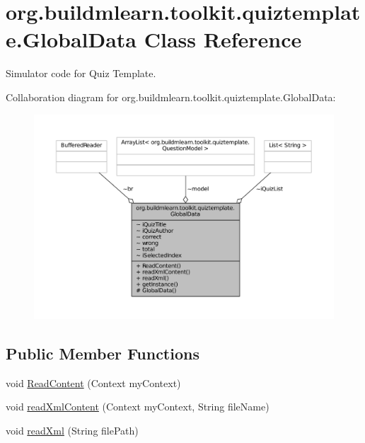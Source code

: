 \hypertarget{classorg_1_1buildmlearn_1_1toolkit_1_1quiztemplate_1_1GlobalData}{\section{org.\-buildmlearn.\-toolkit.\-quiztemplate.\-Global\-Data Class Reference}
\label{classorg_1_1buildmlearn_1_1toolkit_1_1quiztemplate_1_1GlobalData}
}


Simulator code for Quiz Template.  




Collaboration diagram for org.\-buildmlearn.\-toolkit.\-quiztemplate.\-Global\-Data\-:
\nopagebreak
\begin{figure}[H]
\begin{center}
\leavevmode
\includegraphics[width=350pt]{db/db2/classorg_1_1buildmlearn_1_1toolkit_1_1quiztemplate_1_1GlobalData__coll__graph}
\end{center}
\end{figure}
\subsection*{Public Member Functions}
\begin{DoxyCompactItemize}
\item 
void \hyperlink{classorg_1_1buildmlearn_1_1toolkit_1_1quiztemplate_1_1GlobalData_aedd79ff6db8cfbf154c09f911f3b1c46}{Read\-Content} (Context my\-Context)
\item 
void \hyperlink{classorg_1_1buildmlearn_1_1toolkit_1_1quiztemplate_1_1GlobalData_abed3c168b313ac617f44e640d9c572bc}{read\-Xml\-Content} (Context my\-Context, String file\-Name)
\item 
void \hyperlink{classorg_1_1buildmlearn_1_1toolkit_1_1quiztemplate_1_1GlobalData_a77c7ed0e4d625559c4bcb92249e27ed7}{read\-Xml} (String file\-Path)
\end{DoxyCompactItemize}
